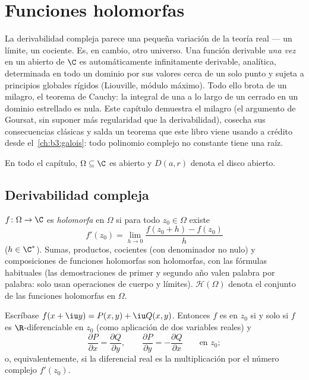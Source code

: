 \chapter{Funciones holomorfas}\label{ch:b3:holomorphic}

La derivabilidad compleja parece una pequeña variación de la teoría real
--- un límite, un cociente. Es, en cambio, otro universo. Una función
derivable \emph{una vez} en un abierto de $\C$ es automáticamente
infinitamente derivable, analítica, determinada en todo un dominio por
sus valores cerca de un solo punto y sujeta a principios globales
rígidos (Liouville, módulo máximo). Todo ello brota de un milagro, el
teorema de Cauchy: la integral de una
 a lo largo de un
 cerrado en un dominio
estrellado es nula. Este capítulo demuestra el milagro (el argumento de
Goursat, sin suponer más regularidad que la derivabilidad), cosecha sus
consecuencias clásicas y salda un teorema que este libro viene usando a
crédito desde el~\cref{ch:b3:galois}: todo polinomio complejo no
constante tiene una raíz.

En todo el capítulo, $\Omega \subseteq \C$ es abierto y $D(a, r)$ denota
el disco abierto.

\section{Derivabilidad compleja}

\begin{definition}\label{def:b3:holomorphic:holo}
$f \colon \Omega \to \C$ es \emph{holomorfa} en
$\Omega$ si para todo $z_0 \in \Omega$ existe
\[
f'(z_0) = \lim_{h\to0}\frac{f(z_0 + h) - f(z_0)}{h}
\]
($h \in \C^*$). Sumas, productos, cocientes (con denominador no nulo) y
composiciones de funciones holomorfas son holomorfas, con las fórmulas
habituales (las demostraciones de primer y segundo año valen palabra por
palabra: solo usan operaciones de cuerpo y límites).
$\mathcal H(\Omega)$ denota el conjunto de las funciones holomorfas en
$\Omega$.
\end{definition}

\begin{proposition}
\label{prop:b3:holomorphic:cauchyriemann}
Escríbase $f(x + \iu y) = P(x,y) + \iu Q(x,y)$. Entonces $f$ es
 en $z_0$ si y solo si $f$ es
$\R$-diferenciable en $z_0$ (como aplicación de dos variables reales)
y
\[
\frac{\partial P}{\partial x} = \frac{\partial Q}{\partial y},
\qquad
\frac{\partial P}{\partial y} = -\frac{\partial Q}{\partial x}
\qquad \text{en } z_0 ;
\]
o, equivalentemente, si la diferencial real es la multiplicación por el
número complejo $f'(z_0)$.
\end{proposition}

